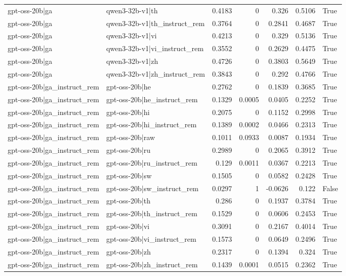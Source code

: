 \begin{table}
\begin{tabular}{l l r r r r l}
gpt-oss-20b|ga & qwen3-32b-v1|th & 0.4183 & 0 & 0.326 & 0.5106 & True \\
gpt-oss-20b|ga & qwen3-32b-v1|th_instruct_rem & 0.3764 & 0 & 0.2841 & 0.4687 & True \\
gpt-oss-20b|ga & qwen3-32b-v1|vi & 0.4213 & 0 & 0.329 & 0.5136 & True \\
gpt-oss-20b|ga & qwen3-32b-v1|vi_instruct_rem & 0.3552 & 0 & 0.2629 & 0.4475 & True \\
gpt-oss-20b|ga & qwen3-32b-v1|zh & 0.4726 & 0 & 0.3803 & 0.5649 & True \\
gpt-oss-20b|ga & qwen3-32b-v1|zh_instruct_rem & 0.3843 & 0 & 0.292 & 0.4766 & True \\
gpt-oss-20b|ga_instruct_rem & gpt-oss-20b|he & 0.2762 & 0 & 0.1839 & 0.3685 & True \\
gpt-oss-20b|ga_instruct_rem & gpt-oss-20b|he_instruct_rem & 0.1329 & 0.0005 & 0.0405 & 0.2252 & True \\
gpt-oss-20b|ga_instruct_rem & gpt-oss-20b|hi & 0.2075 & 0 & 0.1152 & 0.2998 & True \\
gpt-oss-20b|ga_instruct_rem & gpt-oss-20b|hi_instruct_rem & 0.1389 & 0.0002 & 0.0466 & 0.2313 & True \\
gpt-oss-20b|ga_instruct_rem & gpt-oss-20b|raw & 0.1011 & 0.0933 & 0.0087 & 0.1934 & True \\
gpt-oss-20b|ga_instruct_rem & gpt-oss-20b|ru & 0.2989 & 0 & 0.2065 & 0.3912 & True \\
gpt-oss-20b|ga_instruct_rem & gpt-oss-20b|ru_instruct_rem & 0.129 & 0.0011 & 0.0367 & 0.2213 & True \\
gpt-oss-20b|ga_instruct_rem & gpt-oss-20b|sw & 0.1505 & 0 & 0.0582 & 0.2428 & True \\
gpt-oss-20b|ga_instruct_rem & gpt-oss-20b|sw_instruct_rem & 0.0297 & 1 & -0.0626 & 0.122 & False \\
gpt-oss-20b|ga_instruct_rem & gpt-oss-20b|th & 0.286 & 0 & 0.1937 & 0.3784 & True \\
gpt-oss-20b|ga_instruct_rem & gpt-oss-20b|th_instruct_rem & 0.1529 & 0 & 0.0606 & 0.2453 & True \\
gpt-oss-20b|ga_instruct_rem & gpt-oss-20b|vi & 0.3091 & 0 & 0.2167 & 0.4014 & True \\
gpt-oss-20b|ga_instruct_rem & gpt-oss-20b|vi_instruct_rem & 0.1573 & 0 & 0.0649 & 0.2496 & True \\
gpt-oss-20b|ga_instruct_rem & gpt-oss-20b|zh & 0.2317 & 0 & 0.1394 & 0.324 & True \\
gpt-oss-20b|ga_instruct_rem & gpt-oss-20b|zh_instruct_rem & 0.1439 & 0.0001 & 0.0515 & 0.2362 & True \\

\end{tabular}
\end{table}
